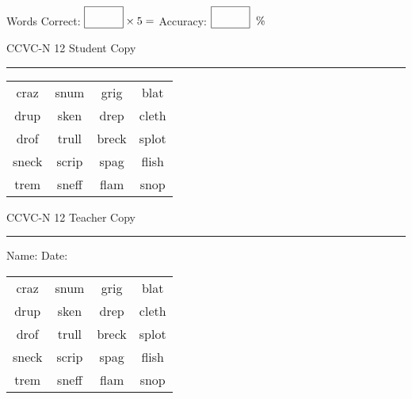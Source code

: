 \documentclass{memoir}
\begin{document}
\small

Words Correct: $\fbox{\phantom{\huge 100}} \times 5 = $ Accuracy: $\fbox{\phantom{\huge 100}}\;\; \%$ 

\vfill

\newpage


\footnotesize \noindent
CCVC-N 12 \hfill Student Copy
\smallskip
\hrule

\Large

\setlength{\tabcolsep}{14pt}
\def\arraystretch{3}

{\selectfont


\begin{vplace}[0.5]
\begin{center}
\begin{tabular}{cccc}
craz        & snum & grig      & blat \\
drup & sken & drep & cleth \\
drof & trull & breck       & splot \\
sneck & scrip & spag          & flish             \\
trem & sneff & flam             & snop \\
\end{tabular}
\end{center}
\end{vplace}

}

\newpage

\footnotesize \noindent
CCVC-N 12 \hfill Teacher Copy
\smallskip
\hrule

\small

\vfill

\noindent
Name: \underline{\hspace{1.75in}} \hfill Date: \underline{\hspace{1in}}

\Large

{\selectfont


\begin{vplace}[0.5]
\begin{center}
\begin{tabular}{cccc}
craz        & snum & grig      & blat \\
drup & sken & drep & cleth \\
drof & trull & breck       & splot \\
sneck & scrip & spag          & flish             \\
trem & sneff & flam             & snop \\
\end{tabular}
\end{center}
\end{vplace}



}
\end{document}
